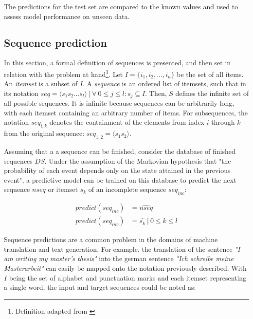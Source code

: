 The predictions for the test set are compared to the known values and used to assess model performance on unseen data.

\subsection{Sequence prediction}
\label{sec:background:sequence-prediction}
In this section, a formal definition of sequences is presented, and then set in relation with the problem at hand\footnote{Definition adapted from \cite{pei2001prefixspan}}.  Let $I = \{i_1, i_2, ..., i_n\}$ be the set of all items. An \textit{itemset} is a subset of $I$. A \textit{sequence} is an ordered list of itemsets, such that in its notation $seq = \langle s_1s_2...s_l \rangle\ |\ \forall\ 0 \leq j \leq l: s_j \subseteq I$. Then, $S$ defines the infinite set of all possible sequences. It is infinite because sequences can be arbitrarily long, with each itemset containing an arbitrary number of items. For  subsequences, the notation $seq_{i,k}$ denotes the containment of the elements from index $i$ through $k$ from the original sequence: $seq_{1,2} = \langle s_1s_2 \rangle$.

Assuming that a a sequence can be finished, consider the database of finished sequences $DS$. Under the assumption of the Markovian hypothesis that "the probability of each event depends only on the state attained in the previous event"\cite{gagniuc2017markov}, a predictive model can be trained on this database to predict the next sequence $nseq$ or itemset $s_k$ of an incomplete sequence $seq_{inc}$:

\begin{equation}
\begin{split}
    predict(seq_{inc}) &= \widehat{nseq}\\
    predict(seq_{inc}) &= \hat{s_k}\ |\ 0 \leq k \leq l
\end{split}
\label{eq:prediction-from-sequence}
\end{equation}

Sequence predictions are a common problem in the domains of machine translation and text generation. For example, the translation of the sentence \textit{"I am writing my master's thesis"} into the german sentence \textit{"Ich schreibe meine Masterarbeit"} can easily be mapped onto the notation previously described. With $I$ being the set of alphabet and punctuation marks and each itemset representing a single word, the input and target sequences could be noted as:

